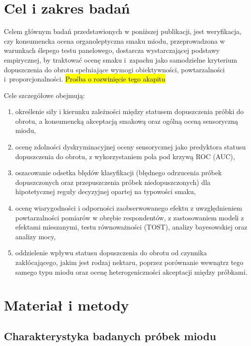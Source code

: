 \documentclass[12pt,a4paper]{article}
\begin{document}
\section{Cel i zakres badań}

Celem głównym badań przedstawionych w poniższej publikacji, jest weryfikacja, czy konsumencka ocena organoleptyczna
smaku miodu, przeprowadzona w warunkach ślepego testu panelowego, dostarcza
wystarczającej podstawy empirycznej, by traktować ocenę smaku i~zapachu jako
samodzielne kryterium dopuszczenia do obrotu spełniające wymogi obiektywności,
powtarzalności i~proporcjonalności.
\hl{Prośba o rozwinięcie tego akapitu}

Cele szczegółowe obejmują:
\begin{enumerate}[label=\roman*.]
    \item określenie siły i kierunku zależności między statusem dopuszczenia
    próbki do obrotu, a konsumencką akceptacją smakową oraz ogólną oceną
    sensoryczną miodu,
    \item ocenę zdolności dyskryminacyjnej oceny sensorycznej jako predyktora
    statusu dopuszczenia do obrotu, z wykorzystaniem pola pod krzywą ROC (AUC),
    \item oszacowanie odsetka błędów klasyfikacji (błędnego odrzucenia próbek
    dopuszczonych oraz przepuszczenia próbek niedopuszczonych) dla hipotetycznej
    reguły decyzyjnej opartej na typowości smaku,
    \item ocenę wiarygodności i odporności zaobserwowanego efektu z
    uwzględnieniem powtarzalności pomiarów w obrębie respondentów, z
    zastosowaniem modeli z efektami mieszanymi, testu równoważności (TOST),
    analizy bayesowskiej oraz analizy mocy,
    \item oddzielenie wpływu statusu dopuszczenia do obrotu od czynnika
    zakłócającego, jakim jest rodzaj nektaru, poprzez porównanie wewnątrz tego
    samego typu miodu oraz ocenę heterogeniczności akceptacji między próbkami.
\end{enumerate}

\section{Materiał i metody}

\subsection{Charakterystyka badanych próbek miodu}
\end{document}

